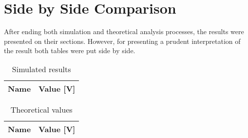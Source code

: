 \section{Side by Side Comparison}
\label{sec:comparison}

After ending both simulation and theoretical analysis processes, the results were presented on their sections. However, for presenting a prudent interpretation of the result both tables were put side by side.

\begin{table}[h]
  \centering
  \begin{tabular}{|l|r|}
    \hline    
    {\bf Name} & {\bf Value [V]} \\ \hline
    
  \end{tabular}
  \caption{Simulated results}
  
  \label{tab:sim}
\end{table}

\begin{table}[h]
  \centering
  \begin{tabular}{|l|r|}
    \hline    
    {\bf Name} & {\bf Value [V]} \\ \hline
    
  \end{tabular}
  \caption{Theoretical values}
  \label{tab:tab1}
\end{table}










